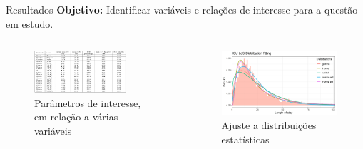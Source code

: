 \documentclass[pdf]
{beamer}
\begin{document}
\begin{frame}{Resultados}
\vspace{0.4cm}
\textbf{Objetivo:} Identificar variáveis e relações de interesse para a questão em estudo.

\begin{columns}
	\begin{column}[T]{0.65\textwidth}
	\vspace{0.2cm}
	\begin{figure}
		\caption*{\small Parâmetros de interesse, em relação a várias variáveis}
		\vspace{-0.2cm}
		\includegraphics[width=0.8\textwidth]{Imagens/Tabela_params.jpg}
	\end{figure}
	\end{column}
	
	\begin{column}[T]{0.35\textwidth}
	\begin{figure}
		\caption*{\small Ajuste a distribuições estatísticas}
		\vspace{-0.2cm}
		\includegraphics[width=\textwidth]{Imagens/distFit_ICU.jpeg}
	\end{figure}
	\end{column}
\end{columns}
\end{frame}
\end{document}
